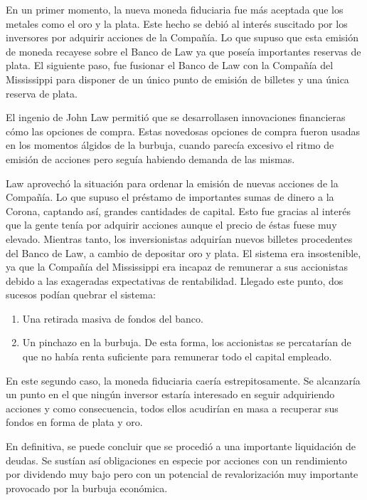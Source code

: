 En un primer momento, la nueva moneda fiduciaria fue más aceptada que los metales como el oro y la plata. Este hecho se debió al interés suscitado por los inversores por adquirir acciones de la Compañía. Lo que supuso que esta emisión de moneda recayese sobre el Banco de Law ya que poseía importantes reservas de plata. 
El siguiente paso, fue fusionar el Banco de Law con la Compañía del Mississippi para disponer de un único punto de emisión de billetes y una única  reserva de plata. 

El ingenio de John Law permitió que se desarrollasen innovaciones financieras cómo las opciones de compra. Estas novedosas opciones de compra fueron usadas en los momentos álgidos de la burbuja, cuando parecía excesivo el ritmo de emisión de acciones pero seguía habiendo demanda de las mismas. 

Law aprovechó la situación para ordenar la emisión de nuevas acciones de la Compañía. Lo que supuso el préstamo de importantes sumas de dinero a la Corona, captando así, grandes cantidades de capital. Esto fue gracias al interés que la gente tenía por adquirir acciones aunque el precio de éstas fuese muy elevado. Mientras tanto, los inversionistas adquirían nuevos billetes procedentes del Banco de Law, a cambio de depositar oro y plata. El sistema era insostenible, ya que la Compañía del Mississippi era incapaz de remunerar a sus accionistas debido a las exageradas expectativas de rentabilidad. Llegado este punto, dos sucesos podían quebrar el sistema: 

\begin{enumerate}
	\item Una retirada masiva de fondos del banco. 
	\item Un pinchazo en la burbuja. De esta forma, los accionistas se percatarían de que no había renta suficiente para remunerar todo el capital empleado.
\end{enumerate}

En este segundo caso, la moneda fiduciaria caería estrepitosamente. Se alcanzaría un punto en el que ningún inversor estaría interesado en seguir adquiriendo acciones y como consecuencia, todos ellos acudirían en masa a recuperar sus fondos en forma de plata y oro. 

En definitiva, se puede concluir que se procedió a una importante liquidación de deudas. Se sustían así obligaciones en especie por acciones con un rendimiento por dividendo muy bajo pero con un potencial de revalorización muy importante provocado por la burbuja económica. 

